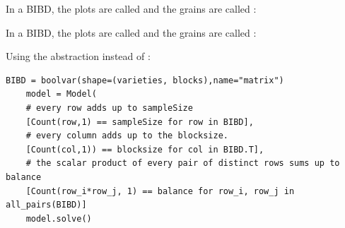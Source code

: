 \documentclass{cons-beamer}
\newcommand{\Variety}{grain}           \newcommand{\Block}{\textnormal{plot}}
\begin{document}
\begin{flashcardcpmpy}
\begin{frame}
  In a BIBD, the plots are called  and the \Variety s are called :

  \begin{example}
    
  \end{example}  
\end{frame}
\end{flashcardcpmpy}
\begin{flashcardminizinc}
\begin{frame}[fragile]
  In a BIBD, the plots are called  and the \Variety s are called :

  \begin{example}
    \footnotesize
    
  \end{example}
  \begin{example}
    \footnotesize
    
  \end{example}
\end{frame}
\begin{frame}[fragile]
  Using the  abstraction instead of :
  \begin{example}
      \begin{lstlisting}[language=cpmpy]
    BIBD = boolvar(shape=(varieties, blocks),name="matrix")
    model = Model(
    # every row adds up to sampleSize
    [Count(row,1) == sampleSize for row in BIBD], 
    # every column adds up to the blocksize.
    [Count(col,1)) == blocksize for col in BIBD.T], 
    # the scalar product of every pair of distinct rows sums up to balance
    [Count(row_i*row_j, 1) == balance for row_i, row_j in all_pairs(BIBD)]
    model.solve() \end{lstlisting}  
  \end{example}  
\end{frame}
\end{flashcardminizinc}
\end{document}
